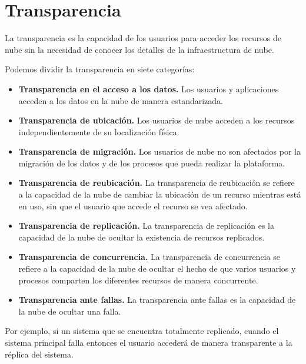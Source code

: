 \section{Transparencia}

La transparencia es la capacidad de los usuarios para acceder los recursos de nube sin la necesidad de conocer los detalles de la infraestructura de nube.

Podemos dividir la transparencia en siete categorías:

\begin{itemize}

\item \textbf{Transparencia en el acceso a los datos.} Los usuarios y aplicaciones acceden a los datos en la nube de manera estandarizada.

\item \textbf{Transparencia de ubicación.} Los usuarios de nube acceden a los recursos independientemente de su localización física.

\item \textbf{Transparencia de migración.} Los usuarios de nube no son afectados por la migración de los datos y de los procesos que pueda realizar la plataforma.

\item \textbf{Transparencia de reubicación.} La transparencia de reubicación se refiere a la capacidad de la nube de cambiar la ubicación de un recurso mientras está en uso, sin que el usuario que accede el recurso se vea afectado.

\item \textbf{Transparencia de replicación.} La transparencia de replicación es la capacidad de la nube de ocultar la existencia de recursos replicados.

\item \textbf{Transparencia de concurrencia.} La transparencia de concurrencia se refiere a la capacidad de la nube de ocultar el hecho de que varios usuarios y procesos comparten los diferentes recursos de manera concurrente.

\item \textbf{Transparencia ante fallas.} La transparencia ante fallas es la capacidad de la nube de ocultar una falla.

\end{itemize}

Por ejemplo, si un sistema que se encuentra totalmente replicado, cuando el sistema principal falla entonces el usuario accederá de manera transparente a la réplica del sistema.

